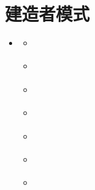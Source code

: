 \documentclass[letterpaper,10pt,english]{sphinxmanual}
\begin{document}
\section{建造者模式}
\label{\detokenize{creational_patterns/builder:builder}}\label{\detokenize{creational_patterns/builder:id1}}\label{\detokenize{creational_patterns/builder::doc}}
\begin{sphinxShadowBox}
\begin{itemize}
\item {} 
\sphinxAtStartPar
{}\label{\detokenize{creational_patterns/builder:id16}}{\hyperref[\detokenize{creational_patterns/builder:builder}]{}}
\begin{itemize}
\item {} 
\sphinxAtStartPar
{}\label{\detokenize{creational_patterns/builder:id17}}{\hyperref[\detokenize{creational_patterns/builder:id3}]{}}

\item {} 
\sphinxAtStartPar
{}\label{\detokenize{creational_patterns/builder:id18}}{\hyperref[\detokenize{creational_patterns/builder:id4}]{}}

\item {} 
\sphinxAtStartPar
{}\label{\detokenize{creational_patterns/builder:id19}}{\hyperref[\detokenize{creational_patterns/builder:id5}]{}}

\item {} 
\sphinxAtStartPar
{}\label{\detokenize{creational_patterns/builder:id20}}{\hyperref[\detokenize{creational_patterns/builder:id6}]{}}

\item {} 
\sphinxAtStartPar
{}\label{\detokenize{creational_patterns/builder:id21}}{\hyperref[\detokenize{creational_patterns/builder:id7}]{}}

\item {} 
\sphinxAtStartPar
{}\label{\detokenize{creational_patterns/builder:id22}}{\hyperref[\detokenize{creational_patterns/builder:id8}]{}}

\item {} 
\sphinxAtStartPar
{}\label{\detokenize{creational_patterns/builder:id23}}{\hyperref[\detokenize{creational_patterns/builder:id9}]{}}


\end{itemize}
\end{itemize}
\end{sphinxShadowBox}
\end{document}

